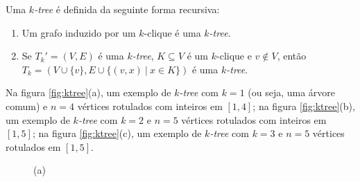 \begin{definition}
  \label{def:ktree}
  \cite{harary} Uma \emph{$k$-tree} é definida da seguinte forma recursiva:

  \begin{enumerate}
    \item Um grafo induzido por um $k$-clique é uma \emph{$k$-tree}.
    \item Se $T_k' = (V, E)$ é uma \emph{$k$-tree}, $K \subseteq V$ é um $k$-clique e $v \not \in V$, então $T_k = (V \cup \{v\}, E \cup \{(v,x) \ | \  x \in K\})$ é uma \emph{$k$-tree}.
  \end{enumerate}

  Na figura \ref{fig:ktree}(a), um exemplo de \emph{$k$-tree} com $k = 1$ (ou seja, uma árvore comum) e $n = 4$ vértices rotulados com inteiros em $[1, 4]$; na figura \ref{fig:ktree}(b), um exemplo de \emph{$k$-tree} com $k = 2$ e $n = 5$ vértices rotulados com inteiros em $[1, 5]$; na figura \ref{fig:ktree}(c), um exemplo de \emph{$k$-tree} com $k = 3$ e $n = 5$ vértices rotulados em $[1, 5]$.

  \begin{figure}
    \begin{minipage}{0.3333\textwidth}
      \centering

      (a)
    \end{minipage}\begin{minipage}{0.3333\textwidth}
      \centering


\end{minipage}
\end{figure}
\end{definition}
